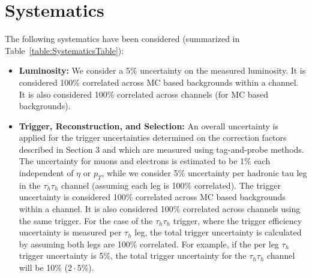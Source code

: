 \section{Systematics}\label{sec:systematics}

The following systematics have been considered (summarized in Table~\ref{table:SystematicsTable}):

\begin{itemize}
%

  \item \textbf{Luminosity:} We consider a 5\% uncertainty on the measured luminosity\cite{REFLUMI}. It is considered 100\% correlated across MC based 
backgrounds within a channel. It is also considered 100\% correlated across channels (for MC based backgrounds).

  \item \textbf{Trigger, Reconstruction, and Selection:} 
  An overall uncertainty is applied for the trigger uncertainties determined on the 
  correction factors described in Section 3 and which are measured using tag-and-probe methods. 
  The uncertainty for muons and electrons is estimated to be 1\% each independent of $\eta$ or $p_{T}$, while we consider 5\% uncertainty per hadronic tau leg in 
the $\tau_{h}\tau_{h}$ channel (assuming each leg is 100\% correlated). The trigger uncertainty is considered 100\% correlated across MC based backgrounds within 
a channel. It is also considered 100\% correlated across channels using the same trigger. For the case of the $\tau_{h}\tau_{h}$ trigger, where the trigger 
efficiency uncertainty is measured per $\tau_{h}$ leg, the total trigger uncertainty is calculated by assuming both legs are 100\% correlated. For example, if the 
per leg $\tau_{h}$ trigger uncertainty is 5\%, the total trigger uncertainty for the $\tau_{h}\tau_{h}$ channel will be 10\% ($2\cdot 5$\%).


\end{itemize}
